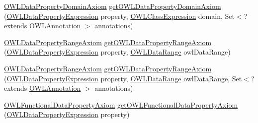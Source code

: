 \begin{DoxyCompactItemize}
\item 
\hyperlink{interfaceorg_1_1semanticweb_1_1owlapi_1_1model_1_1_o_w_l_data_property_domain_axiom}{O\-W\-L\-Data\-Property\-Domain\-Axiom} \hyperlink{interfaceorg_1_1semanticweb_1_1owlapi_1_1model_1_1_o_w_l_data_factory_a1048ca6ad75a21543ae4d86132aaf09d}{get\-O\-W\-L\-Data\-Property\-Domain\-Axiom} (\hyperlink{interfaceorg_1_1semanticweb_1_1owlapi_1_1model_1_1_o_w_l_data_property_expression}{O\-W\-L\-Data\-Property\-Expression} property, \hyperlink{interfaceorg_1_1semanticweb_1_1owlapi_1_1model_1_1_o_w_l_class_expression}{O\-W\-L\-Class\-Expression} domain, Set$<$?extends \hyperlink{interfaceorg_1_1semanticweb_1_1owlapi_1_1model_1_1_o_w_l_annotation}{O\-W\-L\-Annotation} $>$ annotations)
\item 
\hyperlink{interfaceorg_1_1semanticweb_1_1owlapi_1_1model_1_1_o_w_l_data_property_range_axiom}{O\-W\-L\-Data\-Property\-Range\-Axiom} \hyperlink{interfaceorg_1_1semanticweb_1_1owlapi_1_1model_1_1_o_w_l_data_factory_acbaa5529a500c8e2646617287684d4ca}{get\-O\-W\-L\-Data\-Property\-Range\-Axiom} (\hyperlink{interfaceorg_1_1semanticweb_1_1owlapi_1_1model_1_1_o_w_l_data_property_expression}{O\-W\-L\-Data\-Property\-Expression} property, \hyperlink{interfaceorg_1_1semanticweb_1_1owlapi_1_1model_1_1_o_w_l_data_range}{O\-W\-L\-Data\-Range} owl\-Data\-Range)
\item 
\hyperlink{interfaceorg_1_1semanticweb_1_1owlapi_1_1model_1_1_o_w_l_data_property_range_axiom}{O\-W\-L\-Data\-Property\-Range\-Axiom} \hyperlink{interfaceorg_1_1semanticweb_1_1owlapi_1_1model_1_1_o_w_l_data_factory_a2014ce156905dfd3deed416fabdcb152}{get\-O\-W\-L\-Data\-Property\-Range\-Axiom} (\hyperlink{interfaceorg_1_1semanticweb_1_1owlapi_1_1model_1_1_o_w_l_data_property_expression}{O\-W\-L\-Data\-Property\-Expression} property, \hyperlink{interfaceorg_1_1semanticweb_1_1owlapi_1_1model_1_1_o_w_l_data_range}{O\-W\-L\-Data\-Range} owl\-Data\-Range, Set$<$?extends \hyperlink{interfaceorg_1_1semanticweb_1_1owlapi_1_1model_1_1_o_w_l_annotation}{O\-W\-L\-Annotation} $>$ annotations)
\item 
\hyperlink{interfaceorg_1_1semanticweb_1_1owlapi_1_1model_1_1_o_w_l_functional_data_property_axiom}{O\-W\-L\-Functional\-Data\-Property\-Axiom} \hyperlink{interfaceorg_1_1semanticweb_1_1owlapi_1_1model_1_1_o_w_l_data_factory_a56554a779e17595fc29e00cb334e26a7}{get\-O\-W\-L\-Functional\-Data\-Property\-Axiom} (\hyperlink{interfaceorg_1_1semanticweb_1_1owlapi_1_1model_1_1_o_w_l_data_property_expression}{O\-W\-L\-Data\-Property\-Expression} property)
\item 

\end{DoxyCompactItemize}
